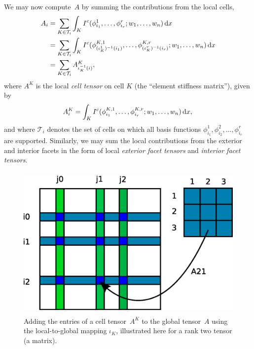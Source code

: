 We may now compute~$A$ by summing the contributions from
the local cells,
\begin{equation}
  \begin{split}
  A_i
  &=
  \sum_{K\in\mathcal{T}_i} \int_K
  I^c(\phi_{i_1}^1, \ldots, \phi_{i_r}^r; w_1, \ldots, w_n) \, \mathrm{d}x \\
  &=
  \sum_{K\in\mathcal{T}_i} \int_K
  I^c(\phi_{(\iota_K^1)^{-1}(i_1)}^{K,1},
      \ldots,
      \phi_{(\iota_K^r)^{-1}(i_r)}^{K,r}; w_1, \ldots, w_n) \, \mathrm{d}x \\
  &=
  \sum_{K\in\mathcal{T}_i}
  A^K_{\iota_K^{-1}(i)},
  \end{split}
\end{equation}
where $A^K$ is the local \emph{cell tensor} on cell $K$ (the ``element
stiffness matrix''), given by
\begin{equation}
  A^K_i = \int_K
  I^c(\phi_{i_1}^{K,1},
  \ldots,
  \phi_{i_r}^{K,r}; w_1, \ldots, w_n) \, \mathrm{d}x, \\
\end{equation}
and where $\mathcal{T}_i$ denotes the set of cells on which all basis
functions $\phi_{i_1}^1, \phi_{i_2}^2, \ldots, \phi_{i_r}^r$ are supported.
Similarly, we may sum the local contributions
from the exterior and interior facets in the form of local
\emph{exterior facet tensors} and \emph{interior facet tensors}.

\begin{figure}[htbp]
  \begin{center}
    \includegraphics[height=3in]{eps/insertion.eps}
    \caption{Adding the entries of a cell tensor~$A^K$ to the
      global tensor~$A$ using the  local-to-global mapping
      $\iota_K$, illustrated here for a rank two
      tensor (a matrix).}
    \label{fig:insertion}
  \end{center}
\end{figure}


